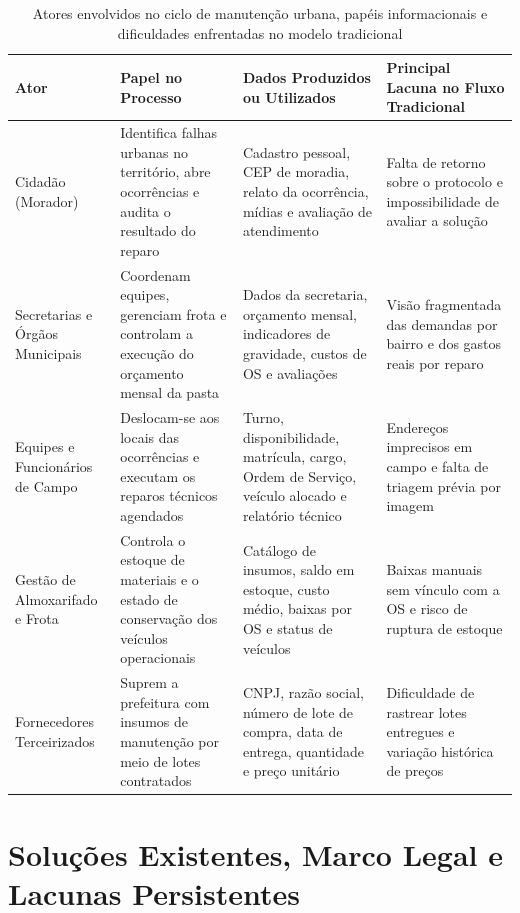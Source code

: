 \begin{table}[htb]
\ABNTEXfontereduzida
\caption{Atores envolvidos no ciclo de manutenção urbana, papéis informacionais e dificuldades enfrentadas no modelo tradicional}
\label{tab:atores-sistema}
\centering
\begin{tabular}{L{2.7cm} L{4.2cm} L{4.0cm} L{3.3cm}}
\toprule
\textbf{Ator} & \textbf{Papel no Processo} & \textbf{Dados Produzidos ou Utilizados} & \textbf{Principal Lacuna no Fluxo Tradicional} \\
\midrule
Cidadão (Morador) & Identifica falhas urbanas no território, abre ocorrências e audita o resultado do reparo & Cadastro pessoal, CEP de moradia, relato da ocorrência, mídias e avaliação de atendimento & Falta de retorno sobre o protocolo e impossibilidade de avaliar a solução \\
Secretarias e Órgãos Municipais & Coordenam equipes, gerenciam frota e controlam a execução do orçamento mensal da pasta & Dados da secretaria, orçamento mensal, indicadores de gravidade, custos de OS e avaliações & Visão fragmentada das demandas por bairro e dos gastos reais por reparo \\
Equipes e Funcionários de Campo & Deslocam-se aos locais das ocorrências e executam os reparos técnicos agendados & Turno, disponibilidade, matrícula, cargo, Ordem de Serviço, veículo alocado e relatório técnico & Endereços imprecisos em campo e falta de triagem prévia por imagem \\
Gestão de Almoxarifado e Frota & Controla o estoque de materiais e o estado de conservação dos veículos operacionais & Catálogo de insumos, saldo em estoque, custo médio, baixas por OS e status de veículos & Baixas manuais sem vínculo com a OS e risco de ruptura de estoque \\
Fornecedores Terceirizados & Suprem a prefeitura com insumos de manutenção por meio de lotes contratados & CNPJ, razão social, número de lote de compra, data de entrega, quantidade e preço unitário & Dificuldade de rastrear lotes entregues e variação histórica de preços \\
\bottomrule
\end{tabular}
\end{table}

\section{Soluções Existentes, Marco Legal e Lacunas Persistentes}
\label{sec:solucoes-lacunas}

